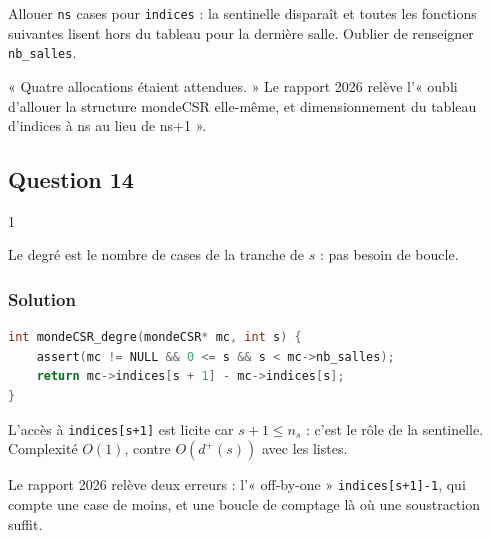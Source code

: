 \documentclass[11pt,a4paper]{article}
\begin{document}
\begin{piege}

Allouer \texttt{ns} cases pour \texttt{indices} : la sentinelle disparaît et toutes les fonctions suivantes lisent hors du tableau pour la dernière salle. Oublier de renseigner \texttt{nb\_salles}.

\end{piege}

\begin{jury}

« Quatre allocations étaient attendues. » Le rapport 2026 relève l'« oubli d'allouer la structure mondeCSR elle-même, et dimensionnement du tableau d'indices à ns au lieu de ns+1 ».

\end{jury}

\hypertarget{question-14}{%
\subsection{Question 14}\label{question-14}}

\begin{indication}{1}

Le degré est le nombre de cases de la tranche de \(s\) : pas besoin de boucle.

\end{indication}

\hypertarget{solution-13}{%
\subsubsection{Solution}\label{solution-13}}

\begin{lstlisting}[language=C]
int mondeCSR_degre(mondeCSR* mc, int s) {
    assert(mc != NULL && 0 <= s && s < mc->nb_salles);
    return mc->indices[s + 1] - mc->indices[s];
}
\end{lstlisting}

L'accès à \texttt{indices{[}s+1{]}} est licite car \(s + 1 \le n_s\) : c'est le rôle de la sentinelle. Complexité \(O(1)\), contre \(O(d^+(s))\) avec les listes.

\begin{piege}

Le rapport 2026 relève deux erreurs : l'« off-by-one » \texttt{indices{[}s+1{]}-1}, qui compte une case de moins, et une boucle de comptage là où une soustraction suffit.

\end{piege}
\end{document}
